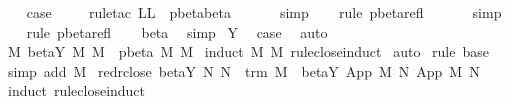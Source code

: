 \begin{isabellebody}
\ \ \isamarkupfalse%
\ {\isacharquery}case\ \isanewline
\ \ \isamarkupfalse%
\ {\isacharparenleft}rule{\isacharunderscore}tac\ L{\isacharequal}L\ \ pbeta{\isachardot}beta{\isacharparenright}\isanewline
\ \ \isamarkupfalse%
\ {}\ \isamarkupfalse%
\ simp\isanewline
\ \ \isamarkupfalse%
\ {\isacharparenleft}rule\ pbeta{\isacharunderscore}refl{\isacharparenright}\isanewline
\ \ \isamarkupfalse%
\ {}\ \isamarkupfalse%
\ simp\isanewline
\ \ \isamarkupfalse%
\ {\isacharparenleft}rule\ pbeta{\isacharunderscore}refl{\isacharparenright}\isanewline
\ \ \isamarkupfalse%
\ beta\ \isamarkupfalse%
\ simp\isanewline
{}\isamarkupfalse%
\isanewline
{}\isamarkupfalse%
\ Y\ \isamarkupfalse%
\ {\isacharquery}case\ \isamarkupfalse%
\ auto\isanewline
{}\isamarkupfalse%
%
\endisatagproof
{\isafoldproof}%
%
\isadelimproof
\isanewline
%
\endisadelimproof
\isanewline
{}\isamarkupfalse%
\ M{}{\isacharcolon}\ {\isachardoublequoteopen}beta{\isacharunderscore}Y{\isacharasterisk}\ M\ M{\isacharprime}\ {\isasymLongrightarrow}\ pbeta{\isacharasterisk}\ M\ M{\isacharprime}{\isachardoublequoteclose}\isanewline
%
\isadelimproof
%
\endisadelimproof
%
\isatagproof
{}\isamarkupfalse%
\ {\isacharparenleft}induct\ M\ M{\isacharprime}\ rule{\isacharcolon}close{\isachardot}induct{\isacharparenright}\isanewline
{}\isamarkupfalse%
\ auto\isanewline
{}\isamarkupfalse%
\ {\isacharparenleft}rule\ base{\isacharparenright}\isanewline
{}\isamarkupfalse%
\ {\isacharparenleft}simp\ add{\isacharcolon}\ M{}{\isacharprime}{\isacharparenright}%
\endisatagproof
{\isafoldproof}%
%
\isadelimproof
\isanewline
%
\endisadelimproof
\isanewline
{}\isamarkupfalse%
\ red{\isacharunderscore}r{\isacharunderscore}close{\isacharcolon}\ {\isachardoublequoteopen}beta{\isacharunderscore}Y{\isacharasterisk}\ N\ N{\isacharprime}\ {\isasymLongrightarrow}\ trm\ M\ {\isasymLongrightarrow}\ beta{\isacharunderscore}Y{\isacharasterisk}\ {\isacharparenleft}App\ M\ N{\isacharparenright}\ {\isacharparenleft}App\ M\ N{\isacharprime}{\isacharparenright}{\isachardoublequoteclose}\isanewline
%
\isadelimproof
%
\endisadelimproof
%
\isatagproof
{}\isamarkupfalse%
\ {\isacharparenleft}induct\ rule{\isacharcolon}close{\isachardot}induct{\isacharparenright}\isanewline

\end{isabellebody}
